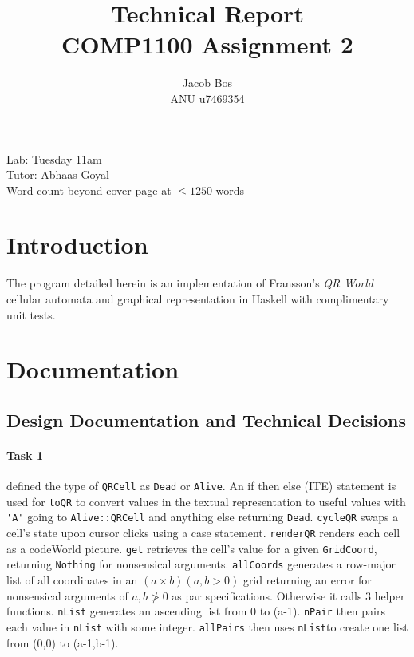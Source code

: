\documentclass[11pt]{article}
\title{Technical Report\\ COMP1100 Assignment 2}
\author{Jacob Bos\\ ANU u7469354}
\begin{document}
\maketitle
{}
\begin{center}
  Lab: Tuesday 11am\\
  Tutor: Abhaas Goyal\\
  Word-count beyond cover page at $\leq 1250$ words
\end{center}
\tableofcontents
\newpage
{}
\section{Introduction} 
The program detailed herein is an implementation of Fransson's \textit{QR World} cellular automata and graphical representation in Haskell with complimentary unit tests.


\section{Documentation}%
\subsection{Design Documentation and Technical Decisions}
\paragraph{Task 1}  defined the type of  \verb|QRCell| as \verb|Dead| or \verb|Alive|.  An if then else (ITE) statement is used for \verb|toQR| to convert values in the textual representation to useful values with \verb|'A'| going to \verb|Alive::QRCell| and anything else returning  \verb|Dead|.  \verb|cycleQR| swaps a cell's state upon cursor clicks using a case statement.   \verb|renderQR| renders each cell as a codeWorld picture.  \verb|get| retrieves the cell's value for a given \verb|GridCoord|, returning \verb|Nothing| for nonsensical arguments. \verb|allCoords| generates a row-major list of all coordinates in an $(a\times b)(a,b>0)$ grid returning an error for nonsensical arguments of $a,b\not>0$ as par specifications. Otherwise it calls 3 helper functions. \verb|nList| generates an ascending list from 0 to (a-1). \verb|nPair| then pairs each value in  \verb|nList| with some integer. \verb|allPairs| then uses \verb|nList|to create one list from (0,0) to (a-1,b-1). 
\end{document}
